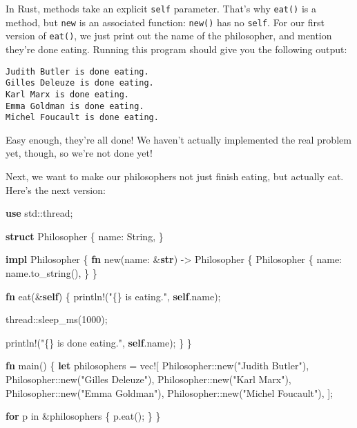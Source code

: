 \documentclass[a4paper,]{book}
\newenvironment{Shaded}{\begin{snugshade}}{\end{snugshade}}
\newcommand{\KeywordTok}[1]{\textcolor[rgb]{0.13,0.29,0.53}{\textbf{{#1}}}}
\newcommand{\DecValTok}[1]{\textcolor[rgb]{0.00,0.00,0.81}{{#1}}}
\newcommand{\StringTok}[1]{\textcolor[rgb]{0.31,0.60,0.02}{{#1}}}
\newcommand{\OtherTok}[1]{\textcolor[rgb]{0.56,0.35,0.01}{{#1}}}
\newcommand{\NormalTok}[1]{{#1}}
\begin{document}
In Rust, methods take an explicit \texttt{self} parameter. That's why
\texttt{eat()} is a method, but \texttt{new} is an associated function:
\texttt{new()} has no \texttt{self}. For our first version of
\texttt{eat()}, we just print out the name of the philosopher, and
mention they're done eating. Running this program should give you the
following output:

\begin{verbatim}
Judith Butler is done eating.
Gilles Deleuze is done eating.
Karl Marx is done eating.
Emma Goldman is done eating.
Michel Foucault is done eating.
\end{verbatim}

Easy enough, they're all done! We haven't actually implemented the real
problem yet, though, so we're not done yet!

Next, we want to make our philosophers not just finish eating, but
actually eat. Here's the next version:

\begin{Shaded}
\begin{Highlighting}[]
\KeywordTok{use} \NormalTok{std::thread;}

\KeywordTok{struct} \NormalTok{Philosopher \{}
    \NormalTok{name: String,}
\NormalTok{\}   }

\KeywordTok{impl} \NormalTok{Philosopher \{ }
    \KeywordTok{fn} \NormalTok{new(name: &}\KeywordTok{str}\NormalTok{) -> Philosopher \{}
        \NormalTok{Philosopher \{}
            \NormalTok{name: name.to_string(),}
        \NormalTok{\}}
    \NormalTok{\}}
    
    \KeywordTok{fn} \NormalTok{eat(&}\KeywordTok{self}\NormalTok{) \{}
        \OtherTok{println!}\NormalTok{(}\StringTok{"\{\} is eating."}\NormalTok{, }\KeywordTok{self}\NormalTok{.name);}

        \NormalTok{thread::sleep_ms(}\DecValTok{1000}\NormalTok{);}

        \OtherTok{println!}\NormalTok{(}\StringTok{"\{\} is done eating."}\NormalTok{, }\KeywordTok{self}\NormalTok{.name);}
    \NormalTok{\}}
\NormalTok{\}}

\KeywordTok{fn} \NormalTok{main() \{}
    \KeywordTok{let} \NormalTok{philosophers = }\OtherTok{vec!}\NormalTok{[}
        \NormalTok{Philosopher::new(}\StringTok{"Judith Butler"}\NormalTok{),}
        \NormalTok{Philosopher::new(}\StringTok{"Gilles Deleuze"}\NormalTok{),}
        \NormalTok{Philosopher::new(}\StringTok{"Karl Marx"}\NormalTok{),}
        \NormalTok{Philosopher::new(}\StringTok{"Emma Goldman"}\NormalTok{),}
        \NormalTok{Philosopher::new(}\StringTok{"Michel Foucault"}\NormalTok{),}
    \NormalTok{];}

    \KeywordTok{for} \NormalTok{p in &philosophers \{}
        \NormalTok{p.eat();}
    \NormalTok{\}}
\NormalTok{\}}
\end{Highlighting}
\end{Shaded}
\end{document}
